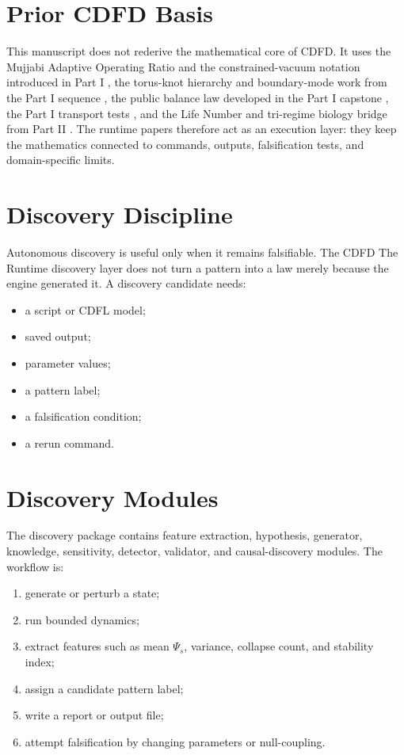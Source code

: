 \documentclass[12pt,a4paper]{article}
\begin{document}
\section{Prior CDFD Basis}
This manuscript does not rederive the mathematical core of CDFD. It uses the
Mujjabi Adaptive Operating Ratio and the constrained-vacuum notation introduced
in Part I \cite{MujjabiI2026}, the torus-knot hierarchy and boundary-mode work
from the Part I sequence \cite{MujjabiVI2026,MujjabiIX2026}, the public balance
law developed in the Part I capstone \cite{MujjabiX2026}, the Part I transport
tests \cite{MujjabiXII2026}, and the Life Number and tri-regime biology bridge
from Part II \cite{MujjabiPartII2026}. The runtime papers therefore act as an
execution layer: they keep the mathematics connected to commands, outputs,
falsification tests, and domain-specific limits.


\section{Discovery Discipline}
Autonomous discovery is useful only when it remains falsifiable. The CDFD
The Runtime discovery layer does not turn a pattern into a law merely because
the engine generated it. A discovery candidate needs:
\begin{itemize}
    \item a script or CDFL model;
    \item saved output;
    \item parameter values;
    \item a pattern label;
    \item a falsification condition;
    \item a rerun command.
\end{itemize}

\section{Discovery Modules}
The discovery package contains feature extraction, hypothesis, generator,
knowledge, sensitivity, detector, validator, and causal-discovery modules. The
workflow is:
\begin{enumerate}
    \item generate or perturb a state;
    \item run bounded dynamics;
    \item extract features such as mean $\Psi_s$, variance, collapse count, and
    stability index;
    \item assign a candidate pattern label;
    \item write a report or output file;
    \item attempt falsification by changing parameters or null-coupling.
\end{enumerate}
\end{document}
